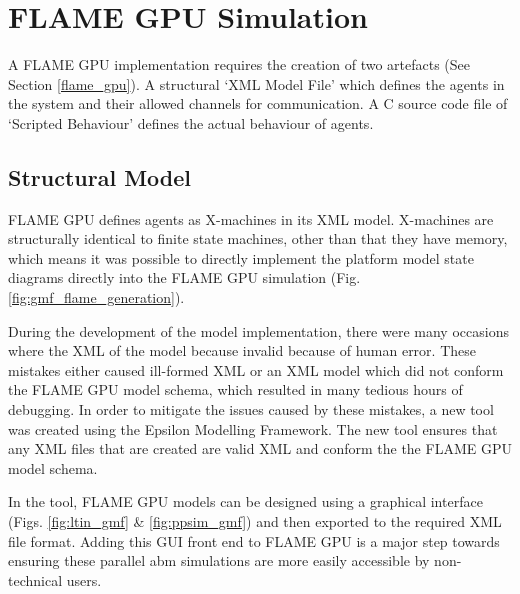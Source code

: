 \documentclass{UoYCSproject}
\begin{document}
\section{\gls{FLAME GPU} Simulation}
\label{ppsim_v2}
A \gls{FLAME GPU} implementation requires the creation of two artefacts (See Section \ref{flame_gpu}).
A structural `XML Model File' which defines the agents in the system and their allowed channels for communication.
A C source code file of `Scripted Behaviour' defines the actual behaviour of agents.

\subsection{Structural Model}
\gls{FLAME GPU} defines agents as X-machines in its XML model.
X-machines are structurally identical to finite state machines, other than that they have memory, which means it was possible to directly implement the platform model state diagrams directly into the \gls{FLAME GPU} simulation (Fig. \ref{fig:gmf_flame_generation}).

During the development of the model implementation, there were many occasions where the XML of the model because invalid because of human error.
These mistakes either caused ill-formed XML or an XML model which did not conform the \gls{FLAME GPU} model schema, which resulted in many tedious hours of debugging.
In order to mitigate the issues caused by these mistakes, a new tool was created using the Epsilon Modelling Framework.
The new tool ensures that any XML files that are created are valid XML and conform the the \gls{FLAME GPU} model schema.

In the tool, \gls{FLAME GPU} models can be designed using a graphical interface (Figs. \ref{fig:ltin_gmf} \& \ref{fig:ppsim_gmf}) and then exported to the required XML file format.
Adding this GUI front end to \gls{FLAME GPU} is a major step towards ensuring these parallel \gls{abm} simulations are more easily accessible by non-technical users.
\end{document}
